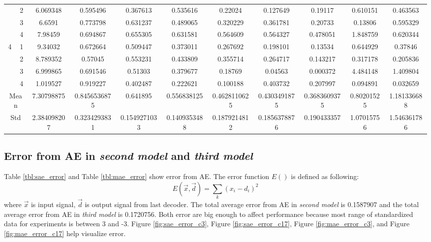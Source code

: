 \documentclass[draft,dvipsnames]{drexel-thesis}
\begin{document}
\begin{thesis}
\begin{table}[!t]
{\begin{tabular}{|c|c|c|c|c|c|c|c|c|c|c|}
                      & 2                   & 6.069348    & 0.595496     & 0.367613     & 0.535616     & 0.22024      & 0.127649     & 0.19117      & 0.610151   & 0.463563    \\ \cline{2-11} 
                      & 3                   & 6.6591      & 0.773798     & 0.631237     & 0.489065     & 0.320229     & 0.361781     & 0.20733      & 0.13806    & 0.595329    \\ \cline{2-11} 
                      & 4                   & 7.98459     & 0.694867     & 0.655305     & 0.631581     & 0.564609     & 0.564327     & 0.478051     & 1.848759   & 0.620344    \\ \hline
\multirow{4}{*}{4}    & 1                   & 9.34032     & 0.672664     & 0.509447     & 0.373011     & 0.267692     & 0.198101     & 0.13534      & 0.644929   & 0.37846     \\ \cline{2-11} 
                      & 2                   & 8.789352    & 0.57045      & 0.553231     & 0.433809     & 0.355714     & 0.264717     & 0.143217     & 0.317178   & 0.205836    \\ \cline{2-11} 
                      & 3                   & 6.999865    & 0.691546     & 0.51303      & 0.379677     & 0.18769      & 0.04563      & 0.000372     & 4.484148   & 1.409804    \\ \cline{2-11} 
                      & 4                   & 1.019527    & 0.919227     & 0.402487     & 0.222621     & 0.100188     & 0.403732     & 0.207997     & 0.094891   & 0.032659    \\ \hline
\multicolumn{2}{|c|}{Mean}                  & 7.30798875  & 0.8456536875 & 0.641895     & 0.556838125  & 0.4628110625 & 0.4303491875 & 0.3683609375 & 0.80201525 & 1.181336688 \\ \hline
\multicolumn{2}{|c|}{Std}                   & 2.384098207 & 0.3234293831 & 0.1549271033 & 0.1409353488 & 0.1879214812 & 0.1856378876 & 0.190433357  & 1.07015756 & 1.546361786 \\ \hline
\end{tabular}}
\end{table}

\subsection{Error from AE in {\em second model} and {\em third model}}
Table \ref{tbl:sae_error} and Table \ref{tbl:mae_error} show error from AE. The error function $E()$ is defined as following:
$$E(\vec{x}, \vec{d})=\sum_k(x_i-d_i)^2$$
where $\vec{x}$ is input signal, $\vec{d}$ is output signal from last decoder. The total average error from AE in {\em second model} is 0.1587907 and the total average error from AE in {\em third model} is 0.1720756. Both error are big enough to affect performance because most range of standardized data for experiments is between 3 and -3. Figure \ref{fig:sae_error_c3}, Figure \ref{fig:sae_error_c17}, Figure \ref{fig:mae_error_c3}, and Figure \ref{fig:mae_error_c17} help visualize error.


\end{thesis}
\end{document}
